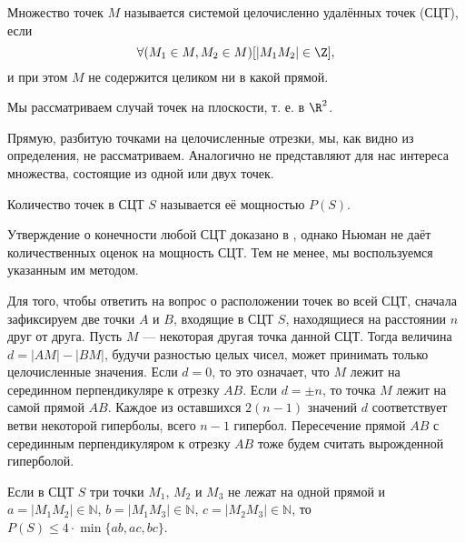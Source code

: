 

\linespread{1.468}
\large

\begin{opr}
	Множество точек $M$ называется системой целочисленно удалённых точек (СЦТ), если
	$$
		\forall(M_1 \in M, M_2\in M)[|M_1 M_2|\in\Z],
	$$
	и при этом $M$ не содержится целиком ни в какой прямой.
\end{opr}

\begin{zamech}
	Мы рассматриваем случай точек на плоскости, т. е. в $\R^2$.
\end{zamech}

\begin{zamech}
	Прямую, разбитую точками на целочисленные отрезки, мы, как видно из определения, не рассматриваем.
	Аналогично не представляют для нас интереса множества, состоящие из одной или двух точек.
\end{zamech}

\begin{opr}
	Количество точек в СЦТ $S$ называется её мощностью $P(S)$.
\end{opr}

Утверждение о конечности любой СЦТ доказано в \cite{Newman}, однако Ньюман не даёт количественных оценок на мощность СЦТ.
Тем не менее, мы воспользуемся указанным им методом.

Для того, чтобы ответить на вопрос о расположении точек во всей СЦТ, сначала зафиксируем две точки $A$ и $B$, входящие в СЦТ $S$, находящиеся на расстоянии $n$ друг от друга.
Пусть $M$ --- некоторая другая точка данной СЦТ.
Тогда величина $d=|AM|-|BM|$, будучи разностью целых чисел, может принимать только целочисленные значения.
Если $d=0$, то это означает, что $M$ лежит на серединном перпендикуляре к отрезку $AB$.
Если $d=\pm n$, то точка $M$ лежит на самой прямой $AB$.
Каждое из оставшихся $2(n-1)$ значений $d$ соответствует ветви некоторой гиперболы, всего $n-1$ гипербол.
Пересечение прямой $AB$ с серединным перпендикуляром к отрезку $AB$ тоже будем считать вырожденной гиперболой.

\begin{lemma}\label{lemma_Semenova}
	Если в СЦТ $S$ три точки $M_1$, $M_2$ и $M_3$ не лежат на одной прямой и 
	$a=|M_1 M_2| \in \mathbb{N}$,
	$b=|M_1 M_3| \in \mathbb{N}$,
	$c=|M_2 M_3| \in \mathbb{N}$,
	то 
	$P(S) \leq 4\cdot\min\{ab,ac,bc\}$.
\end{lemma}

